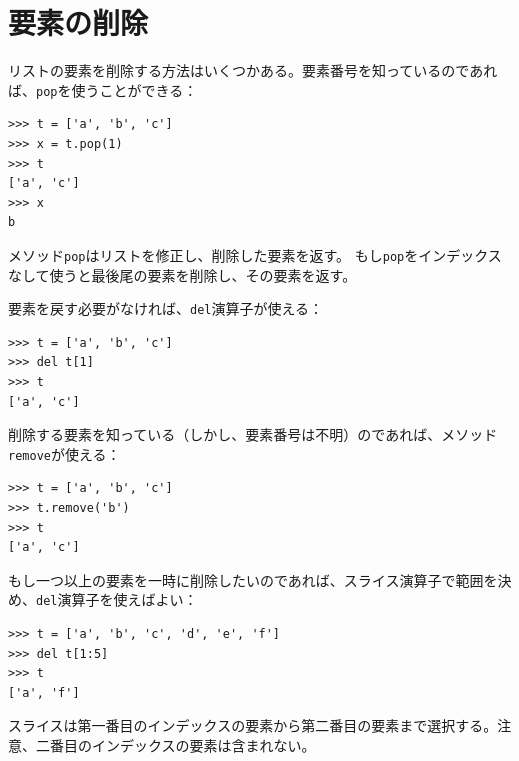 \documentclass[a4j,12pt,makeidx]{jbook}
\begin{document}
\section{要素の削除}
リストの要素を削除する方法はいくつかある。要素番号を知っているのであれば、{\tt pop}を使うことができる：
\begin{verbatim}
>>> t = ['a', 'b', 'c']
>>> x = t.pop(1)
>>> t
['a', 'c']
>>> x
b
\end{verbatim}
メソッド{\tt pop}はリストを修正し、削除した要素を返す。
もし{\tt pop}をインデックスなして使うと最後尾の要素を削除し、その要素を返す。\par
要素を戻す必要がなければ、{\tt del}演算子が使える：
\begin{verbatim}
>>> t = ['a', 'b', 'c']
>>> del t[1]
>>> t
['a', 'c']
\end{verbatim} \par
削除する要素を知っている（しかし、要素番号は不明）のであれば、メソッド{\tt remove}が使える：
\begin{verbatim}
>>> t = ['a', 'b', 'c']
>>> t.remove('b')
>>> t
['a', 'c']
\end{verbatim} \par
もし一つ以上の要素を一時に削除したいのであれば、スライス演算子で範囲を決め、{\tt del}演算子を使えばよい：
\begin{verbatim}
>>> t = ['a', 'b', 'c', 'd', 'e', 'f']
>>> del t[1:5]
>>> t
['a', 'f']
\end{verbatim}
スライスは第一番目のインデックスの要素から第二番目の要素まで選択する。注意、二番目のインデックスの要素は含まれない。\\
%
\end{document}
